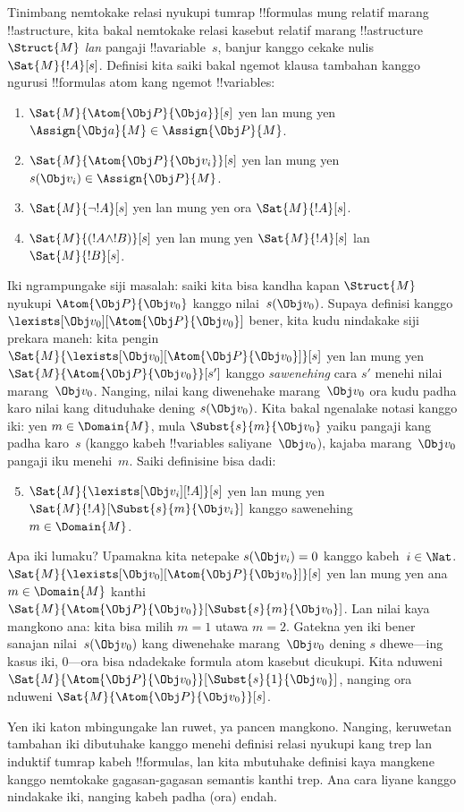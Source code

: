 \documentclass[../../../include/open-logic-section]{subfiles}
\begin{document}
Tinimbang nemtokake relasi nyukupi tumrap !!{formula}s mung relatif
marang !!a{structure}, kita bakal nemtokake relasi kasebut relatif
marang !!a{structure}~$\Struct{M}$ \emph{lan} pangaji
!!a{variable}~$s$, banjur kanggo cekake nulis $\Sat{M}{!A}[s]$.
Definisi kita saiki bakal ngemot klausa tambahan kanggo ngurusi
!!{formula}s atom kang ngemot !!{variable}s:
\begin{enumerate}
  \item $\Sat{M}{\Atom{\Obj P}{\Obj a}}[s]$ yen lan mung yen
  $\Assign{\Obj a}{M} \in \Assign{\Obj P}{M}$.
  \item $\Sat{M}{\Atom{\Obj P}{\Obj v_i}}[s]$ yen lan mung yen
  $s(\Obj v_i) \in \Assign{\Obj P}{M}$.
  \item $\Sat{M}{\lnot !A}[s]$ yen lan mung yen ora $\Sat{M}{!A}[s]$.
  \item $\Sat{M}{(!A \land !B)}[s]$ yen lan mung yen $\Sat{M}{!A}[s]$ lan $\Sat{M}{!B}[s]$.
\end{enumerate}
Iki ngrampungake siji masalah: saiki kita bisa kandha kapan $\Struct{M}$
nyukupi $\Atom{\Obj P}{\Obj v_0}$ kanggo nilai~$s(\Obj v_0)$. Supaya
definisi kanggo $\lexists[\Obj v_0][\Atom{\Obj P}{\Obj v_0}]$ bener,
kita kudu nindakake siji prekara maneh: kita pengin
$\Sat{M}{\lexists[\Obj v_0][\Atom{\Obj P}{\Obj v_0}]}[s]$ yen lan
mung yen $\Sat{M}{\Atom{\Obj P}{\Obj v_0}}[s']$ kanggo \emph{sawenehing}
cara $s'$ menehi nilai marang~$\Obj v_0$. Nanging, nilai kang diwenehake
marang~$\Obj v_0$ ora kudu padha karo nilai kang dituduhake dening
$s(\Obj v_0)$. Kita bakal ngenalake notasi kanggo iki: yen $m \in
\Domain{M}$, mula $\Subst{s}{m}{\Obj v_0}$ yaiku pangaji kang padha
karo~$s$ (kanggo kabeh !!{variable}s saliyane~$\Obj v_0$), kajaba
marang~$\Obj v_0$ pangaji iku menehi~$m$. Saiki definisine bisa dadi:
\begin{enumerate}\setcounter{enumi}{4}
  \item $\Sat{M}{\lexists[\Obj v_i][!A]}[s]$ yen lan mung yen
  $\Sat{M}{!A}[\Subst{s}{m}{\Obj v_i}]$ kanggo sawenehing~$m \in \Domain{M}$.
\end{enumerate}
Apa iki lumaku? Upamakna kita netepake $s(\Obj v_i) = 0$ kanggo
kabeh~$i \in \Nat$. $\Sat{M}{\lexists[\Obj v_0][\Atom{\Obj P}{\Obj
v_0}]}[s]$ yen lan mung yen ana $m \in \Domain{M}$ kanthi
$\Sat{M}{\Atom{\Obj P}{\Obj v_0}}[\Subst{s}{m}{\Obj v_0}]$. Lan
nilai kaya mangkono ana: kita bisa milih $m = 1$ utawa $m = 2$.
Gatekna yen iki bener sanajan nilai~$s(\Obj v_0)$ kang diwenehake
marang~$\Obj v_0$ dening $s$ dhewe---ing kasus iki, $0$---ora bisa
ndadekake formula atom kasebut dicukupi. Kita nduweni $\Sat{M}{\Atom{\Obj P}{\Obj
v_0}}[\Subst{s}{1}{\Obj v_0}]$, nanging ora nduweni
$\Sat{M}{\Atom{\Obj P}{\Obj v_0}}[s]$.

Yen iki katon mbingungake lan ruwet, ya pancen mangkono. Nanging,
keruwetan tambahan iki dibutuhake kanggo menehi definisi relasi
nyukupi kang trep lan induktif tumrap kabeh !!{formula}s, lan kita
mbutuhake definisi kaya mangkene kanggo nemtokake gagasan-gagasan
semantis kanthi trep. Ana cara liyane kanggo nindakake iki, nanging
kabeh padha (ora) endah.
\end{document}
